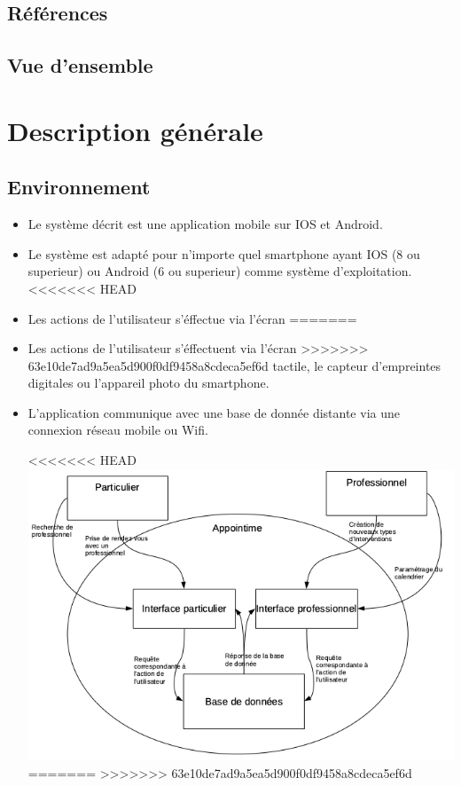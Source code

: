 \documentclass{article}
\begin{document}
\begin{itemize}
\begin{itemize}
\end{itemize}


\subsection{Références}

\subsection{Vue d'ensemble}


\section{Description générale}
\subsection{Environnement}
\begin{itemize}
\item Le système décrit est une application mobile sur IOS et
Android.
\item Le système est adapté pour n'importe quel smartphone ayant IOS (8 ou superieur) ou Android (6 ou superieur) comme
système d'exploitation.
<<<<<<< HEAD
\item Les actions de l'utilisateur s'éffectue via l'écran
=======
\item Les actions de l'utilisateur s'éffectuent via l'écran
>>>>>>> 63e10de7ad9a5ea5d900f0df9458a8cdeca5ef6d
  tactile, le capteur d'empreintes digitales ou l'appareil photo du smartphone.
\item L'application communique avec une base de donnée distante
  via une connexion \og réseau mobile\fg{} ou Wifi.


<<<<<<< HEAD
\includegraphics[scale=0.5]{ShematDiagrammes/ShematGeneral.png}
=======
>>>>>>> 63e10de7ad9a5ea5d900f0df9458a8cdeca5ef6d
\end{itemize}

\end{itemize}
\end{document}
